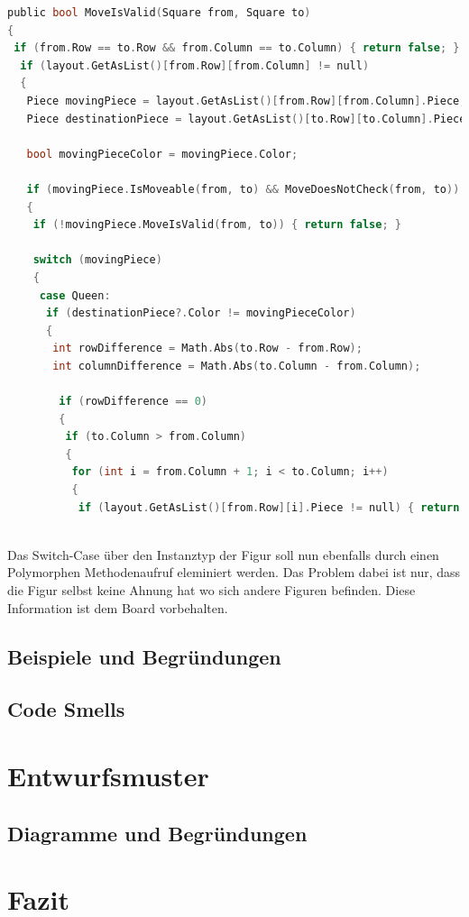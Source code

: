 \documentclass{article}
\begin{document}
	\begin{lstlisting}[language=c, style=mStyle]
public bool MoveIsValid(Square from, Square to)
{
 if (from.Row == to.Row && from.Column == to.Column) { return false; }
  if (layout.GetAsList()[from.Row][from.Column] != null)
  {
   Piece movingPiece = layout.GetAsList()[from.Row][from.Column].Piece;
   Piece destinationPiece = layout.GetAsList()[to.Row][to.Column].Piece;

   bool movingPieceColor = movingPiece.Color;

   if (movingPiece.IsMoveable(from, to) && MoveDoesNotCheck(from, to))
   {
	if (!movingPiece.MoveIsValid(from, to)) { return false; }

	switch (movingPiece)
	{
	 case Queen:
	  if (destinationPiece?.Color != movingPieceColor)
	  {
	   int rowDifference = Math.Abs(to.Row - from.Row);
	   int columnDifference = Math.Abs(to.Column - from.Column);

	    if (rowDifference == 0)
		{
		 if (to.Column > from.Column)
		 {
		  for (int i = from.Column + 1; i < to.Column; i++)
		  {
		   if (layout.GetAsList()[from.Row][i].Piece != null) { return false; }
		  
	\end{lstlisting}

	Das Switch-Case über den Instanztyp der Figur soll nun ebenfalls durch einen Polymorphen Methodenaufruf eleminiert werden. Das Problem dabei ist nur, dass die Figur selbst keine Ahnung hat wo sich andere Figuren befinden. Diese Information ist dem Board vorbehalten. 




\subsection{Beispiele und Begründungen}

\subsection{Code Smells}

\section{Entwurfsmuster}
\subsection{Diagramme und Begründungen}

\section{Fazit}\label{sec:end}
\end{document}
